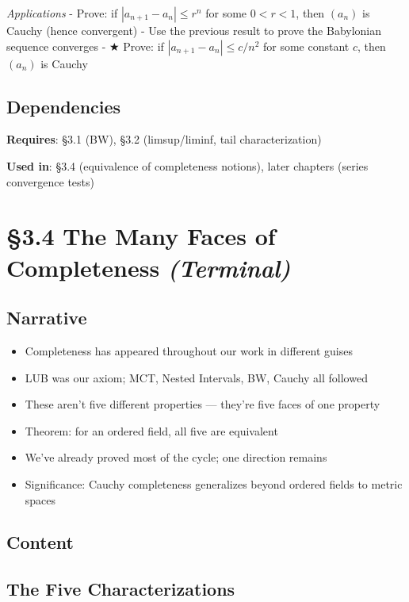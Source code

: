 \documentclass[
  10pt,
  letterpaper,
]{scrbook}
\providecommand{\tightlist}{%
  \setlength{\itemsep}{0pt}\setlength{\parskip}{0pt}}
\begin{document}
\emph{Applications} - Prove: if \(|a_{n+1} - a_n| \leq r^n\) for some
\(0 < r < 1\), then \((a_n)\) is Cauchy (hence convergent) - Use the
previous result to prove the Babylonian sequence converges - ★ Prove: if
\(|a_{n+1} - a_n| \leq c/n^2\) for some constant \(c\), then \((a_n)\)
is Cauchy

\subsection{Dependencies}\label{dependencies-13}

\textbf{Requires}: §3.1 (BW), §3.2 (limsup/liminf, tail
characterization)

\textbf{Used in}: §3.4 (equivalence of completeness notions), later
chapters (series convergence tests)

\section{\texorpdfstring{§3.4 The Many Faces of Completeness
\emph{(Terminal)}}{§3.4 The Many Faces of Completeness (Terminal)}}\label{the-many-faces-of-completeness-terminal}

\subsection{Narrative}\label{narrative-14}

\begin{itemize}
\tightlist
\item
  Completeness has appeared throughout our work in different guises
\item
  LUB was our axiom; MCT, Nested Intervals, BW, Cauchy all followed
\item
  These aren't five different properties --- they're five faces of one
  property
\item
  Theorem: for an ordered field, all five are equivalent
\item
  We've already proved most of the cycle; one direction remains
\item
  Significance: Cauchy completeness generalizes beyond ordered fields to
  metric spaces
\end{itemize}

\subsection{Content}\label{content-14}

\subsection{The Five
Characterizations}\label{the-five-characterizations}
\end{document}
